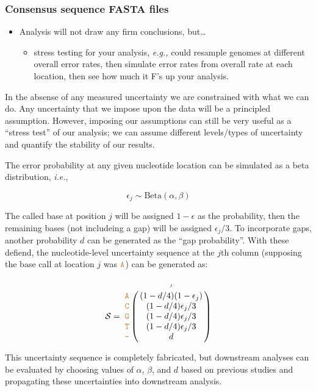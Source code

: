 \documentclass[
]{article}
\providecommand{\tightlist}{%
  \setlength{\itemsep}{0pt}\setlength{\parskip}{0pt}}
\newcommand{\eg}{\textit{e.g.,}\xspace}
\newcommand{\ie}{\textit{i.e.},\xspace}
\newcommand{\sq}[1]{\texttt{\textcolor{brown}{#1}}}
\newcommand{\nps}{\mathcal{S}} %
\begin{document}
\hypertarget{consensus-sequence-fasta-files}{%
\subsubsection{Consensus sequence FASTA
files}\label{consensus-sequence-fasta-files}}

\begin{itemize}
\tightlist
\item
  Analysis will not draw any firm conclusions, but\ldots{}

  \begin{itemize}
  \tightlist
  \item
    stress testing for your analysis, \eg could resample genomes at
    different overall error rates, then simulate error rates from
    overall rate at each location, then see how much it F's up your
    analysis.
  \end{itemize}
\end{itemize}

In the absense of any measured uncertainty we are constrained with what
we can do. Any uncertainty that we impose upon the data will be a
principled assumption. However, imposing our assumptions can still be
very useful as a ``stress test'' of our analysis; we can assume
different levels/types of uncertainty and quantify the stability of our
results.

The error probability at any given nucleotide location can be simulated
as a beta distribution, \ie 

\[
\epsilon_j \sim\text{Beta}(\alpha, \beta)
\]

The called base at position \(j\) will be assigned \(1- \epsilon\) as
the probability, then the remaining bases (not includeing a gap) will be
assigned \(\epsilon_j/3\). To incorporate gaps, another probability
\(d\) can be generated as the ``gap probability''. With these defiend,
the nucleotide-level uncertainty sequence at the \(j\)th column
(supposing the base call at location \(j\) was \(\sq{A}\)) can be
generated as:

\[
\nps = 
\bordermatrix{
&\scriptscriptstyle{j}  \cr
\sq{A} & (1 - d/4)(1-\epsilon_j) \cr
\sq{C} & (1 - d/4)\epsilon_j/3 \cr
\sq{G} & (1 - d/4)\epsilon_j/3 \cr
\sq{T} & (1 - d/4)\epsilon_j/3 \cr
\sq{-} & d \cr
}
\]

This uncertainty sequence is completely fabricated, but downstream
analyses can be evaluated by choosing values of \(\alpha\), \(\beta\),
and \(d\) based on previous studies and propagating these uncertainties
into downstream analysis.
\end{document}

